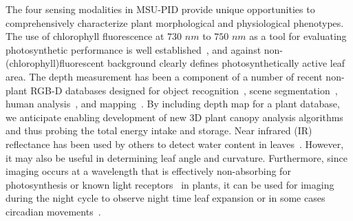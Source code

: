 
The four sensing modalities in MSU-PID provide unique opportunities to comprehensively characterize plant morphological and physiological phenotypes.
The use of chlorophyll fluorescence at $730$ $nm$ to $750$ $nm$ as a tool for evaluating photosynthetic performance is well established~\cite{baker2008chlorophyll}, and against non-(chlorophyll)fluorescent background clearly defines photosynthetically active leaf area.
The depth measurement has been a component of a number of recent non-plant RGB-D databases designed for object recognition~\cite{Lai2011}, scene segmentation~\cite{Silberman2011}, human analysis~\cite{Sung2011,Barbosa:reid12}, and mapping~\cite{sturm12iros}.
By including depth map for a plant database, we anticipate enabling development of new $3$D plant canopy analysis algorithms and thus probing the total energy intake and storage.
Near infrared (IR) reflectance has been used by others to detect water content in leaves~\cite{chen2014dissecting}.
However, it may also be useful in determining leaf angle and curvature.
Furthermore, since imaging occurs at a wavelength that is effectively non-absorbing for photosynthesis or known light receptors~\cite{butler1964actton,eskins1992light} in plants, it can be used for imaging during the night cycle to observe night time leaf expansion or in some cases circadian movements~\cite{mcclung2006plant}.






